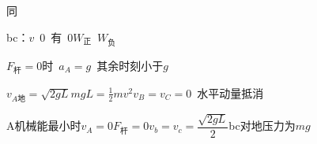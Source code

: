 同


bc：$v$\ 0\ 有\ 0\quad $W_{\text{正}}$\ $W_{\text{负}}$

$F_{\text{杆}}=0$时\ $a_A=g$\ 其余时刻小于$g$

$v_{A\text{地}}=\sqrt{2gL}$\quad $mgL=\frac{1}{2}mv^2$\quad $v_B=v_C=0$\ 水平动量抵消

A机械能最小时\quad $v_A=0$\quad $F_{\text{杆}}=0$\quad $v_b=v_c=\dfrac{\sqrt{2gL}}{2}$\quad bc对地压力为$mg$

